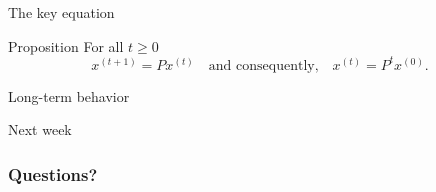 \documentclass{beamer}
\begin{document}
\begin{frame}[t]{The key equation}
	\grid

	\vspace{-0.4cm}
	\begin{block}{Proposition}
		For all $t \geq 0$
		$$
		x^{(t+1)} = P x^{(t)}
		\quad \text{and consequently,} \quad
		x^{(t)} =  P^t x^{(0)}.
		$$
	\end{block}

\end{frame}

\begin{frame}[t]{Long-term behavior}
	\grid


\end{frame}

\begin{frame}[t]{Next week}
	\grid


\end{frame}

\appendix
\backupbegin
\begin{frame}[t]
	\frametitle{Questions?}
	\grid

	\pause
\end{frame}
\backupend
\end{document}
